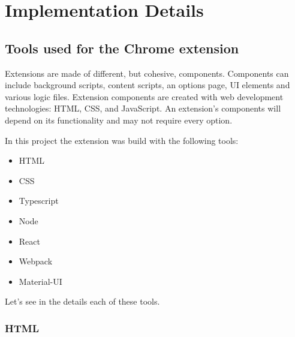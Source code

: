 \chapter{Implementation Details}

\section{Tools used for the Chrome extension}

Extensions are made of different, but cohesive, components. Components can include background scripts, content scripts, an options page, UI elements and various logic files. Extension components are created with web development technologies: HTML, CSS, and JavaScript. An extension's components will depend on its functionality and may not require every option.

In this project the extension was build with the following tools:

\begin{itemize}
    \item HTML
    \item CSS
    \item Typescript
    \item Node
    \item React
    \item Webpack
    \item Material-UI
\end{itemize}

Let's see in the details each of these tools.

\subsection {HTML}

